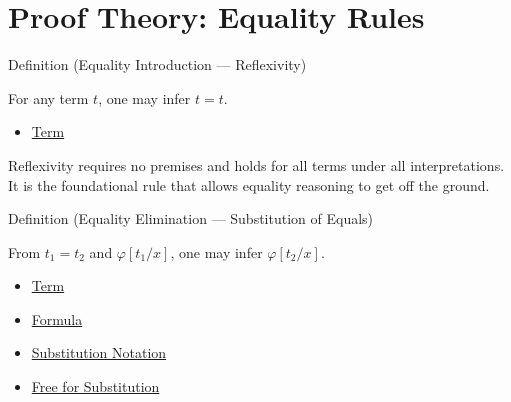 
\section{Proof Theory: Equality Rules}


\begin{definitionbox}{Definition (Equality Introduction — Reflexivity)}
\begin{definition}\label{def:eq-refl}
For any term $t$, one may infer $t = t$.
\end{definition}
\end{definitionbox}

\begin{dependencies}
\begin{itemize}
  \item \hyperref[def:term]{Term}
\end{itemize}
\end{dependencies}

\begin{remark*}
Reflexivity requires no premises and holds for all terms under all
interpretations. It is the foundational rule that allows equality reasoning to
get off the ground.
\end{remark*}

\begin{definitionbox}{Definition (Equality Elimination — Substitution of Equals)}
\begin{definition}\label{def:eq-elim}
From $t_1 = t_2$ and $\varphi[t_1/x]$, one may infer $\varphi[t_2/x]$.
\end{definition}
\end{definitionbox}

\begin{dependencies}
\begin{itemize}
  \item \hyperref[def:term]{Term}
  \item \hyperref[def:formula]{Formula}
  \item \hyperref[def:subst-notation]{Substitution Notation}
  \item \hyperref[def:free-for]{Free for Substitution}
\end{itemize}
\end{dependencies}

